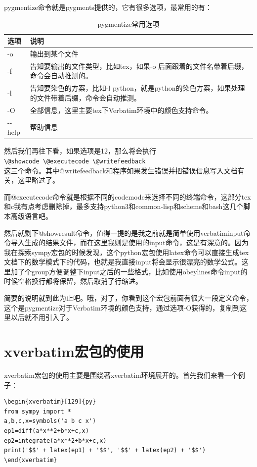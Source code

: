 \documentclass[11pt,oneside]{book}
\begin{document}
pygmentize命令就是pygments提供的，它有很多选项，最常用的有：
\begin{table}[H]
\centering
\label{tab:pygmentize常用选项}
\caption{pygmentize常用选项}
\medskip 
\begin{tabular}{@{}lp{28em}@{}}
\toprule
选项 & 说明  \\ \midrule
-o  & 输出到某个文件  \\
-f  & 告知要输出的文件类型，比如tex，如果-o 后面跟着的文件名带着后缀，命令会自动推测的。 \\
-l & 告知要染色的方案，比如-l python，就是python的染色方案，如果处理的文件带着后缀，命令会自动推测。  \\
-O & 全部信息，这里主要tex下Verbatim环境中的颜色支持命令。 \\
-{}-help  & 帮助信息 \\ \bottomrule
\end{tabular}
\end{table}

然后我们再往下看，如果选项是12，那么将会执行\\
\verb+\@showcode \@executecode \@writefeedback+\\
这三个命令。其中@writefeedback和程序如果发生错误并把错误信息写入文档有关，这里略过了。

而@executecode命令就是根据不同的codemode来选择不同的终端命令，这部分tex和c我有点考虑删除掉，最多支持python3和common-lisp和scheme和bash这几个脚本高级语言吧。

然后就剩下@showresult命令，值得一提的是我之前就是简单使用verbatiminput命令导入生成的结果文件，而在这里我则是使用的input命令，这是有深意的。因为我在探索sympy宏包的时候发现，这个python宏包使用latex命令可以直接生成tex文档下的数学模式下的代码，也就是我直接input将会显示很漂亮的数学公式。这里加了个group方便调整下input之后的一些格式，比如使用obeylines命令input的时候空格换行都将保留，然后取消了行缩进。

简要的说明就到此为止吧。哦，对了，你看到这个宏包前面有很大一段定义命令，这个是pygmentize对于Verbatim环境的颜色支持，通过选项-O获得的，复制到这里以后就不用引入了。


\section{xverbatim宏包的使用}
xverbatim宏包的使用主要是围绕著xverbatim环境展开的。首先我们来看一个例子：
\begin{Verbatim}
\begin{xverbatim}[129]{py}
from sympy import *
a,b,c,x=symbols('a b c x') 
ep1=diff(a*x**2+b*x+c,x)
ep2=integrate(a*x**2+b*x+c,x)
print('$$' + latex(ep1) + '$$', '$$' + latex(ep2) + '$$')
\end{xverbatim}
\end{Verbatim}
\end{document}
